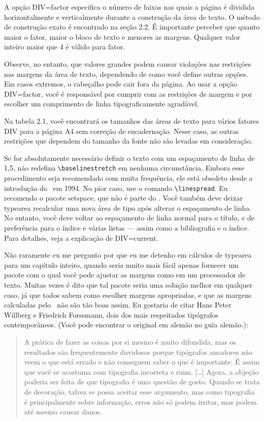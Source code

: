 A opção DIV=factor especifica o número de faixas nas quais a página é dividida horizontalmente e verticalmente durante a construção da área de texto. O método de construção exato é encontrado na seção 2.2. É importante perceber que quanto maior o fator, maior o bloco de texto e menores as margens. Qualquer valor inteiro maior que 4 é válido para fator.

Observe, no entanto, que valores grandes podem causar violações nas restrições nas margens da área de texto, dependendo de como você define outras opções. Em casos extremos, o cabeçalho pode cair fora da página. Ao usar a opção DIV=factor, você é responsável por cumprir com as restrições de margem e por escolher um comprimento de linha tipograficamente agradável.

Na tabela 2.1, você encontrará os tamanhos das áreas de texto para vários fatores DIV para a página A4 sem correção de encadernação. Nesse caso, as outras restrições que dependem do tamanho da fonte não são levadas em consideração.

Se for absolutamente necessário definir o texto com um espaçamento de linha de 1,5, não redefina \verb|\baselinestretch| em nenhuma circunstância. Embora esse procedimento seja recomendado com muita frequência, ele está obsoleto desde a introdução do \LaTeXe\ em 1994. No pior caso, use o comando \verb|\linespread|. Eu recomendo o pacote setspace, que não é parte do \KOMAScript. Você também deve deixar typearea recalcular uma nova área de tipo após alterar o espaçamento de linha. No entanto, você deve voltar ao espaçamento de linha normal para o título, e de preferência para o índice e várias listas — assim como a bibliografia e o índice. Para detalhes, veja a explicação de DIV=current.

Não raramente eu me pergunto por que eu me detenho em cálculos de typearea para um capítulo inteiro, quando seria muito mais fácil apenas fornecer um pacote com o qual você pode ajustar as margens como em um processador de texto. Muitas vezes é dito que tal pacote seria uma solução melhor em qualquer caso, já que todos sabem como escolher margens apropriadas, e que as margens calculadas pelo \KOMAScript\ não são tão boas assim. Eu gostaria de citar Hans Peter Willberg e Friedrich Forssmann, dois dos mais respeitados tipógrafos contemporâneos. (Você pode encontrar o original em alemão no guia alemão.):

\begin{quote}
 A prática de fazer as coisas por si mesmo é muito difundida, mas os resultados são frequentemente duvidosos porque tipógrafos amadores não veem o que está errado e não conseguem saber o que é importante. É assim que você se acostuma com tipografia incorreta e ruim. [\ldots] Agora, a objeção poderia ser feita de que tipografia é uma questão de gosto. Quando se trata de decoração, talvez se possa aceitar esse argumento, mas como tipografia é principalmente sobre informação, erros não só podem irritar, mas podem até mesmo causar danos.   
\end{quote}




